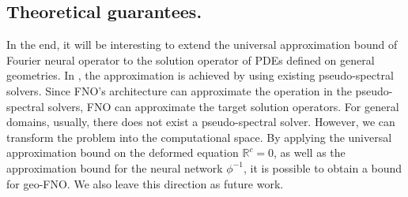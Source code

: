 \documentclass{article}
\newcommand{\R}{\mathbb{R}}
\begin{document}
\subsection{Theoretical guarantees.}
In the end, it will be interesting to extend the universal approximation bound of Fourier neural operator\citep{kovachki2021universal} to the solution operator of PDEs defined on general geometries. In \cite{kovachki2021universal}, the approximation is achieved by using existing pseudo-spectral solvers. Since FNO's architecture can approximate the operation in the pseudo-spectral solvers, FNO can approximate the target solution operators. For general domains, usually, there does not exist a pseudo-spectral solver. However, we can transform the problem into the computational space. By applying the universal approximation bound on the deformed equation $\R^c = 0$, as well as the approximation bound for the neural network $\phi^{-1}$, it is possible to obtain a bound for geo-FNO. We also leave this direction as future work. 
\end{document}
